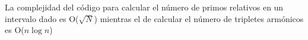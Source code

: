La complejidad del código para calcular el número de primos relativos en un intervalo dado es O($\sqrt N$) mientras el de calcular el número de tripletes armónicos es O($n \log n$)